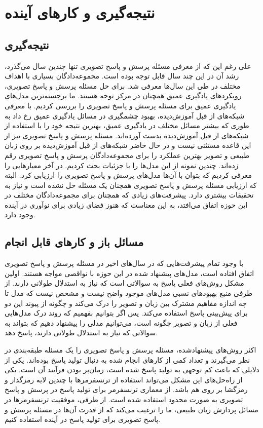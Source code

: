 \chapter{نتیجه‌گیری و کار‌های آینده}
\thispagestyle{empty}

\section{نتیجه‌گیری}
	 علی رغم این که از معرفی مسئله پرسش و پاسخ تصویری تنها چندین سال می‌گذرد، رشد آن در این چند سال قابل توجه‌ بوده است. مجموعه‌دادگان بسیاری با اهداف مختلف در طی این سال‌ها معرفی شد. برای حل مسئله پرسش و پاسخ تصویری، رویکرد‌های یادگیری عمیق همچنان در مرکز توجه هستند. ما برجسته‌ترین مدل‌های یادگیری عمیق برای مسئله پرسش و پاسخ تصویری را بررسی کردیم. با معرفی شبکه‌های از قبل آموزش‌دیده، بهبود چشمگیری در مسائل یادگیری عمیق رخ داد به طوری که بیشتر مسائل مختلف در یادگیری عمیق، بهترین نتیجه خود را با استفاده از شبکه‌های از قبل آموزش‌دیده بدست آورده‌اند. مسئله پرسش و پاسخ تصویری نیز از این قاعده مستثنی نیست و در حال حاضر شبکه‌های از قبل آموزش‌دیده بر روی زبان طبیعی و تصویر بهترین عملکرد را برای مجموعه‌دادگان پرسش و پاسخ تصویری رقم زده‌اند. چندین نمونه از این مدل‌ها را با جزئیات بحث کردیم. در آخر معیارهایی را معرفی کردیم که بتوان با آن‌ها مدل‌های پرسش و پاسخ تصویری را ارزیابی کرد. البته که ارزیابی مسئله پرسش و پاسخ تصویری همچنان یک مسئله حل نشده است و نیاز به تحقیقات بیشتری دارد. پیشرفت‌های زیادی که همچنان برای مجموعه‌دادگان مختلف در این حوزه اتفاق می‌افتد، به این معناست که هنوز فضای زیادی برای نوآوری در آینده وجود دارد.
\section{مسائل باز و کارهای قابل انجام}
با وجود تمام پیشرفت‌هایی که در سال‌های اخیر در مسئله پرسش و پاسخ تصویری اتفاق افتاده است، مدل‌های پیشنهاد شده در این حوزه با نواقصی مواجه هستند. اولین مشکل روش‌های فعلی پاسخ به سوالاتی است که نیاز به استدلال طولانی دارند. از طرفی منبع بهبود‌های نسبی مدل‌های موجود واضح نیست و مشخص نیست که مدل تا چه اندازه مفاهیم مشترک بین زبان و تصویر را درک می‌کند و چگونه از پیوند این دو برای پیش‌بینی پاسخ استفاده می‌کند. پس اگر بتوانیم بفهمیم که روند درک مدل‌هایی فعلی از زبان و تصویر چگونه است، می‌توانیم مدلی را پیشنهاد دهیم که بتواند به سوالاتی که نیاز به استدلال طولانی دارند، پاسخ دهد.

اکثر روش‌های پیشنهادشده، مسئله پرسش و پاسخ تصویری را یک مسئله ‌طبقه‌بندی در نظر می‌گیرند و تعداد کمی از کارهای انجام شده به دنبال تولید پاسخ بوده‌اند. یکی از دلایلی که باعث کم توجهی به تولید پاسخ شده است، زمان‌بر بودن فرآیند آن است. یکی از راه‌حل‌های این مشکل می‌تواند استفاده از ترنسفرمرها با چندین لایه رمزگذار و رمزگشا بر روی هم باشد. از معماری ترنسفرمر  برای تولید پاسخ در پرسش و پاسخ تصویری به صورت محدود استفاده شده است. از طرفی، موفقیت ترنسفرمر‌ها در مسائل پردازش زبان طبیعی، ما را ترغیب می‌کند که از قدرت آن‌ها در مسئله پرسش و پاسخ تصویری برای تولید پاسخ در آینده استفاده کنیم.

